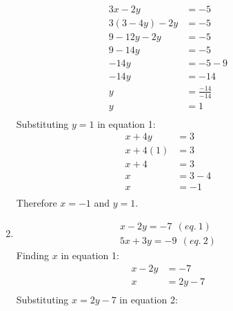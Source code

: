 \documentclass{article}
\begin{document}
\begin{description}
\begin{enumerate}
\begin{equation}
\begin{split}
                          3x - 2y & = -5 \\
                          3(3-4y) - 2y & = -5 \\
                          9 - 12y -2y & = -5 \\
                          9 -14y & = -5 \\
                          -14y & = -5 -9 \\
                          -14y & = -14 \\
                          y & = \frac{-14}{-14} \\
                          y & = 1 \\
                      \end{split}
                  \end{equation}
                  Substituting $y=1$ in equation 1:
                  \begin{equation}
                      \begin{split}
                          x + 4y & = 3 \\
                          x + 4(1) & = 3\\
                          x + 4 & = 3\\
                          x & = 3-4\\
                          x & = -1\\
                      \end{split}
                  \end{equation}
                  Therefore $x=-1$ and $y=1$.
            \item
                  \begin{gather*}
                      x-2y = -7 \ \ (eq. \ 1) \\
                      5x+3y=-9 \ \ (eq. \ 2)
                  \end{gather*}
                  Finding $x$ in equation 1:
                  \begin{equation}
                      \begin{split}
                          x - 2y & = -7 \\
                          x & = 2y - 7 \\
                      \end{split}
                  \end{equation}
                  Substituting $x = 2y - 7$ in equation 2:
                  \begin{equation}

\end{equation}
\end{enumerate}
\end{description}
\end{document}
